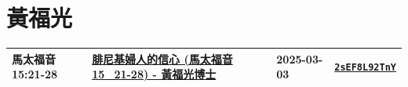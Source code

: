 \documentclass{book}
\begin{document}
\chapter{黃福光}\label{ch:preacher17}
\begin{multicols}{3}
\minitoc
\end{multicols}
{ \scriptsize


\begin{xltabular}{\textwidth}{|p{0.15\textwidth} p{0.6\textwidth}|p{0.07\textwidth} p{0.1\textwidth}|}
\hline
馬太福音 15:21-28 & \hyperref[sec:2sEF8L92TnY]{腓尼基婦人的信心 (馬太福音15\_21-28) - 黃福光博士} & 2025-03-03 & \href{https://youtube.com/watch?v=2sEF8L92TnY}{\texttt{2sEF8L92TnY}} \\
\hline
\end{xltabular}
}
\newpage
\end{document}
